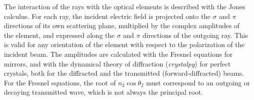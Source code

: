 \documentclass{iucr}
\begin{document}
The interaction of the rays with the optical elements is described with the Jones calculus. For each ray, the incident electric field is projected onto the $\sigma$ and $\pi$ directions of its own scattering plane, multiplied by the complex amplitudes of the element, and expressed along the $\sigma$ and $\pi$ directions of the outgoing ray. This is valid for any orientation of the element with respect to the polarization of the incident beam. The amplitudes are calculated with the Fresnel equations for mirrors, and with the dynamical theory of diffraction ({\it crystalpy}) for perfect crystals, both for the diffracted and the transmitted (forward-diffracted) beams. For the Fresnel equations, the root of $n_2\cos\theta_2$ must correspond to an outgoing or decaying transmitted wave, which is not always the principal root.
\end{document}
